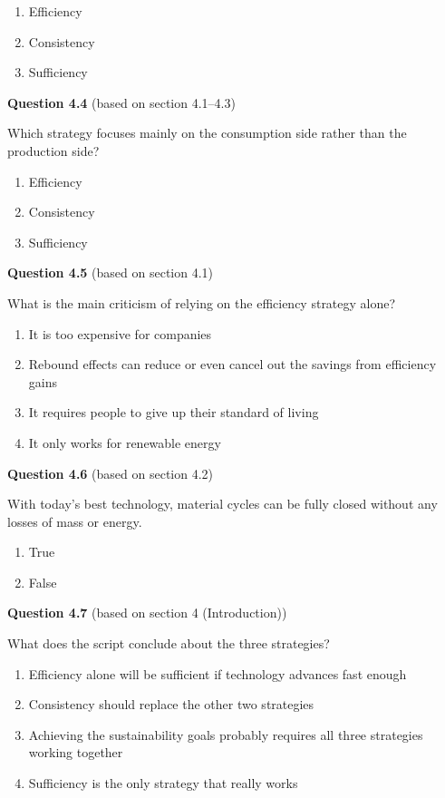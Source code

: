 \documentclass[
  british,
  a4paper,
  DIV=11,
  numbers=noendperiod,
  oneside,
  openany]{scrreprt}
\providecommand{\tightlist}{%
  \setlength{\itemsep}{0pt}\setlength{\parskip}{0pt}}
\begin{document}
\begin{enumerate}
\def\labelenumi{\alph{enumi})}
\tightlist
\item
  Efficiency
\item
  Consistency
\item
  Sufficiency
\end{enumerate}

\textbf{Question 4.4} (based on section 4.1--4.3)

Which strategy focuses mainly on the consumption side rather than the
production side?

\begin{enumerate}
\def\labelenumi{\alph{enumi})}
\tightlist
\item
  Efficiency
\item
  Consistency
\item
  Sufficiency
\end{enumerate}

\textbf{Question 4.5} (based on section 4.1)

What is the main criticism of relying on the efficiency strategy alone?

\begin{enumerate}
\def\labelenumi{\alph{enumi})}
\tightlist
\item
  It is too expensive for companies
\item
  Rebound effects can reduce or even cancel out the savings from
  efficiency gains
\item
  It requires people to give up their standard of living
\item
  It only works for renewable energy
\end{enumerate}

\textbf{Question 4.6} (based on section 4.2)

With today's best technology, material cycles can be fully closed
without any losses of mass or energy.

\begin{enumerate}
\def\labelenumi{\alph{enumi})}
\tightlist
\item
  True
\item
  False
\end{enumerate}

\textbf{Question 4.7} (based on section 4 (Introduction))

What does the script conclude about the three strategies?

\begin{enumerate}
\def\labelenumi{\alph{enumi})}
\tightlist
\item
  Efficiency alone will be sufficient if technology advances fast enough
\item
  Consistency should replace the other two strategies
\item
  Achieving the sustainability goals probably requires all three
  strategies working together
\item
  Sufficiency is the only strategy that really works
\end{enumerate}
\end{document}

